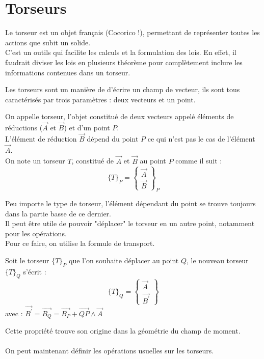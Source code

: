 \chapter{Torseurs}
Le torseur est un objet français (Cocorico !), permettant de représenter toutes les actions que subit un solide.\\
C'est un outils qui facilite les calculs et la formulation des lois.
En effet, il faudrait diviser les lois en plusieurs théorème pour complètement inclure les informations contenues dans un torseur.

Les torseurs sont un manière de d'écrire un champ de vecteur, ils sont tous caractérisés par trois paramètres : deux vecteurs et un point.

\begin{defi}
On appelle torseur, l'objet constitué de deux vecteurs appelé éléments de réductions ($\overrightarrow{A}$ et $\overrightarrow{B}$) et d'un point $P$.\\
L'élément de réduction $\overrightarrow{B}$ dépend du point $P$ ce qui n'est pas le cas de l'élément $\overrightarrow{A}$.\\
On note un torseur $T$, constitué de $\overrightarrow{A}$ et $\overrightarrow{B}$ au point $P$ comme il suit :
$$\{T\}_P=\begin{Bmatrix}\overrightarrow{A}\\\overrightarrow{B}\end{Bmatrix}_P$$
\end{defi}
Peu importe le type de torseur, l'élément dépendant du point se trouve toujours dans la partie basse de ce dernier.\\
Il peut être utile de pouvoir "déplacer" le torseur en un autre point, notamment pour les opérations.\\
Pour ce faire, on utilise la formule de transport.
\begin{prop}
Soit le torseur $\{T\}_P$ que l'on souhaite déplacer au point $Q$, le nouveau torseur $\{T\}_Q$ s'écrit :
$$\{T\}_Q=\begin{Bmatrix}\overrightarrow{A}\\\overrightarrow{B^\prime}\end{Bmatrix}$$
avec : $\overrightarrow{B^\prime}=\overrightarrow{B_Q}=\overrightarrow{B_P}+\overrightarrow{QP}\land\overrightarrow{A}$
\end{prop}
Cette propriété trouve son origine dans la géométrie du champ de moment.\\
\\
On peut maintenant définir les opérations usuelles sur les torseurs.
